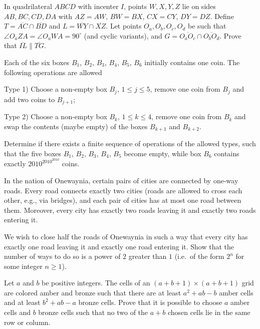 \documentclass[11pt]{scrartcl}
\begin{document}
\begin{problem}[934985329440054]
In quadrilateral $ABCD$ with incenter $I$, points $W,X,Y,Z$ lie on sides $AB, BC,CD,DA$ with $AZ=AW$, $BW=BX$, $CX=CY$, $DY=DZ$. Define $T=\overline{AC}\cap\overline{BD}$ and $L=\overline{WY}\cap\overline{XZ}$. Let points $O_a,O_b,O_c,O_d$ be such that $\angle O_aZA=\angle O_aWA=90^\circ$ (and cyclic variants), and $G=\overline{O_aO_c}\cap\overline{O_bO_d}$. Prove that $\overline{IL}\parallel\overline{TG}$.
\end{problem}
\begin{problem}[134403212065462]
Each of the six boxes $B_1$, $B_2$, $B_3$, $B_4$, $B_5$, $B_6$ initially contains one coin. The following operations are allowed

Type 1) Choose a non-empty box $B_j$, $1\leq j \leq 5$, remove one coin from $B_j$ and add two coins to $B_{j+1}$;

Type 2) Choose a non-empty box $B_k$, $1\leq k \leq 4$, remove one coin from $B_k$ and swap the contents (maybe empty) of the boxes $B_{k+1}$ and $B_{k+2}$.

Determine if there exists a finite sequence of operations of the allowed types, such that the five boxes $B_1$, $B_2$, $B_3$, $B_4$, $B_5$ become empty, while box $B_6$ contains exactly $2010^{2010^{2010}}$ coins.
\end{problem}
\begin{problem}[913214378150707]
In the nation of Onewaynia, certain pairs of cities are connected by one-way roads. Every road connects exactly two cities (roads are allowed to cross each other, e.g., via bridges), and each pair of cities has at most one road between them. Moreover, every city has exactly two roads leaving it and exactly two roads entering it.

We wish to close half the roads of Onewaynia in such a way that every city has exactly one road leaving it and exactly one road entering it. Show that the number of ways to do so is a power of $2$ greater than $1$ (i.e.\ of the form $2^n$ for some integer $n \ge 1$).
\end{problem}
\begin{problem}[257453182523555]
Let $a$ and $b$ be positive integers. The cells of an $(a+b+1)\times (a+b+1)$ grid are colored amber and bronze such that there are at least $a^2+ab-b$ amber cells and at least $b^2+ab-a$ bronze cells. Prove that it is possible to choose $a$ amber cells and $b$ bronze cells such that no two of the $a+b$ chosen cells lie in the same row or column.
\end{problem}
\end{document}
